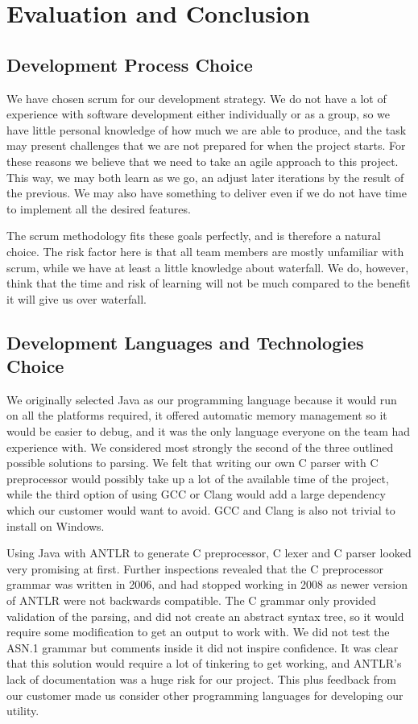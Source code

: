 \section{Evaluation and Conclusion}

\subsection{Development Process Choice}
We have chosen scrum for our development strategy. We do not have a lot of
experience with software development either individually or as a group, so we
have little personal knowledge of how much we are able to produce, and the
task may present challenges that we are not prepared for when the project
starts. For these reasons we believe that we need to take an agile approach to
this project. This way, we may both learn as we go, an adjust later iterations
by the result of the previous. We may also have something to deliver even if we
do not have time to implement all the desired features.

The scrum methodology fits these goals perfectly, and is therefore a natural
choice. The risk factor here is that all team members are mostly unfamiliar
with scrum, while we have at least a little knowledge about waterfall. We do,
however, think that the time and risk of learning will not be much compared to
the benefit it will give us over waterfall.

\subsection{Development Languages and Technologies Choice}
We originally selected Java as our programming language because it would run on
all the platforms required, it offered automatic memory management so it would
be easier to debug, and it was the only language everyone on the team had
experience with. We considered most strongly the second of the three outlined
possible solutions to parsing. We felt that writing our own C parser with C
preprocessor would possibly take up a lot of the available time of the project,
while the third option of using GCC or Clang would add a large dependency which
our customer would want to avoid. GCC and Clang is also not trivial to install
on Windows.

Using Java with ANTLR to generate C preprocessor, C lexer and C parser looked
very promising at first. Further inspections revealed that the C preprocessor
grammar was written in 2006, and had stopped working in 2008 as newer version
of ANTLR were not backwards compatible. The C grammar only provided validation
of the parsing, and did not create an abstract syntax tree, so it would require
some modification to get an output to work with. We did not test the ASN.1
grammar but comments inside it did not inspire confidence. It was clear that
this solution would require a lot of tinkering to get working, and ANTLR’s lack
of documentation was a huge risk for our project. This plus feedback from our
customer made us consider other programming languages for developing our
utility.

